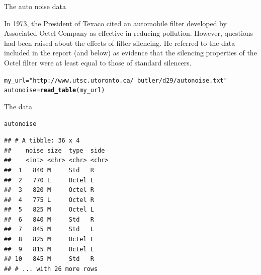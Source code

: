 \documentclass[unknownkeysallowed]{beamer}\usepackage[]{graphicx}\usepackage[]{color}
\makeatletter
\newcommand{\hlstr}[1]{\textcolor[rgb]{0.192,0.494,0.8}{#1}}%
\newcommand{\hlstd}[1]{\textcolor[rgb]{0.345,0.345,0.345}{#1}}%
\newcommand{\hlkwb}[1]{\textcolor[rgb]{0.69,0.353,0.396}{#1}}%
\newcommand{\hlkwd}[1]{\textcolor[rgb]{0.737,0.353,0.396}{\textbf{#1}}}%
\newenvironment{kframe}{%
 \def\at@end@of@kframe{}%
 \ifinner\ifhmode%
  \def\at@end@of@kframe{\end{minipage}}%
  \begin{minipage}{\columnwidth}%
 \fi\fi%
 \def\FrameCommand##1{\hskip\@totalleftmargin \hskip-\fboxsep
 \colorbox{shadecolor}{##1}\hskip-\fboxsep
     \hskip-\linewidth \hskip-\@totalleftmargin \hskip\columnwidth}%
 \MakeFramed {\advance\hsize-\width
   \@totalleftmargin\z@ \linewidth\hsize
   \@setminipage}}%
 {\par\unskip\endMakeFramed%
 \at@end@of@kframe}
\newenvironment{knitrout}{}{} %
\makeatother
\begin{document}
\begin{frame}[fragile]{The auto noise data}
  
  In 1973, the President of Texaco cited an automobile filter
  developed by Associated Octel Company as effective in reducing
  pollution. However, questions had been raised about the effects of
  filter silencing. He referred to the data included in the report
  (and below) as evidence
  that the silencing properties of the Octel filter were at least
  equal to those of standard silencers. 
 
\begin{knitrout}
\color{fgcolor}\begin{kframe}
\begin{alltt}
\hlstd{my_url}\hlkwb{=}\hlstr{"http://www.utsc.utoronto.ca/~butler/d29/autonoise.txt"}
\hlstd{autonoise}\hlkwb{=}\hlkwd{read_table}\hlstd{(my_url)}
\end{alltt}


{\ttfamily\noindent\itshape\color{messagecolor}{\#\# Parsed with column specification:\\\#\# cols(\\\#\#\ \  noise = col\_integer(),\\\#\#\ \  size = col\_character(),\\\#\#\ \  type = col\_character(),\\\#\#\ \  side = col\_character()\\\#\# )}}\end{kframe}
\end{knitrout}
  
\end{frame}

\begin{frame}[fragile]{The data}
  
\begin{knitrout}
\color{fgcolor}\begin{kframe}
\begin{alltt}
\hlstd{autonoise}
\end{alltt}
\begin{verbatim}
## # A tibble: 36 x 4
##    noise size  type  side 
##    <int> <chr> <chr> <chr>
##  1   840 M     Std   R    
##  2   770 L     Octel L    
##  3   820 M     Octel R    
##  4   775 L     Octel R    
##  5   825 M     Octel L    
##  6   840 M     Std   R    
##  7   845 M     Std   L    
##  8   825 M     Octel L    
##  9   815 M     Octel L    
## 10   845 M     Std   R    
## # ... with 26 more rows
\end{verbatim}
\end{kframe}
\end{knitrout}
  
\end{frame}
\end{document}
